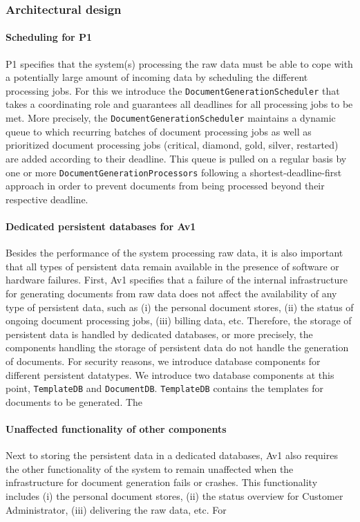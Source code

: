 \documentclass[a4paper,10pt]{article}
\begin{document}
\subsubsection{Architectural design}
\paragraph{Scheduling for P1}
P1 specifies that the system(s) processing the raw data must be able to cope with a potentially large amount of incoming data by scheduling the different processing jobs. For this we introduce the \texttt{DocumentGenerationScheduler} that takes a coordinating role and guarantees all deadlines for all processing jobs to be met. More precisely, the \texttt{DocumentGenerationScheduler} maintains a dynamic queue to which recurring batches of document processing jobs as well as prioritized document processing jobs (critical, diamond, gold, silver, restarted) are added according to their deadline. This queue is pulled on a regular basis by one or more \texttt{DocumentGenerationProcessors} following a shortest-deadline-first approach in order to prevent documents from being processed beyond their respective deadline.

\paragraph{Dedicated persistent databases for Av1}
Besides the performance of the system processing raw data, it is also important that all types of persistent data remain available in the presence of software or hardware failures.
First, Av1 specifies that a failure of the internal infrastructure for generating documents from raw data does not affect the availability of any type of persistent data, such as (i) the personal document stores, (ii) the status of ongoing document processing jobs, (iii) billing data, etc. Therefore, the storage of persistent data is handled by dedicated databases, or more precisely, the components handling the storage of persistent data do not handle the generation of documents. For security reasons, we introduce database components for different persistent datatypes. We introduce two database components at this point, \texttt{TemplateDB} and \texttt{DocumentDB}. \texttt{TemplateDB} contains the templates for documents to be generated. The 

\paragraph{Unaffected functionality of other components}
Next to storing the  persistent data in a dedicated databases, Av1 also requires the other functionality of the system to remain unaffected when the infrastructure for document generation fails or crashes. This functionality includes (i) the personal document stores, (ii) the status overview for Customer Administrator, (iii) delivering the raw data, etc.
For  
\end{document}
